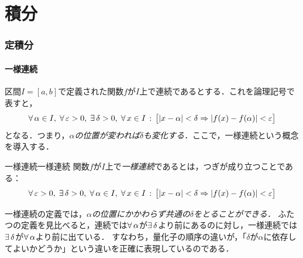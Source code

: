 \part{積分}

\begin{abstract}
この章では，定積分を厳密に定義するための準備として，まず一様連続の概念を導入し，有界閉区間上の連続関数が一様連続であることを示す．次に，区間の分割・上方和・下方和を定義し，細分によって上方和が減少し下方和が増加することを確認する．そのうえで，有界閉区間上の連続関数が積分可能であることを証明し，定積分の基本的な性質とリーマン和を導入する．最後に，$n$次元の有界閉区間に対する体積と分割を定義し，多次元の積分への足がかりとする．
\end{abstract}

\draftpart

\section{定積分}

\subsection{一様連続}

区間$I=[a,b]$で定義された関数$f$が$I$上で連続であるとする．これを論理記号で表すと，
\[
   \forall\, \alpha \in I ,\; \forall\, \varepsilon >0 ,\; \exists\, \delta >0 ,\; \forall\, x \in I \,:\, \bigl[ \lvert x-\alpha\rvert<\delta \mathrel{\Rightarrow} \lvert f(x)-f(\alpha)\rvert<\varepsilon \bigr]
\]
となる．つまり，\emph{$\alpha$の位置が変われば$\delta$も変化する．}ここで，一様連続という概念を導入する．

\begin{definition}{一様連続}{一様連続}
  関数$f$が$I$上で\emph{一様連続}であるとは，つぎが成り立つことである：
  \[
    \forall\, \varepsilon >0 ,\; \exists\, \delta >0 ,\; \forall\, \alpha \in I ,\; \forall\, x \in I \,:\, \bigl[ \lvert x-\alpha\rvert<\delta \mathrel{\Rightarrow} \lvert f(x)-f(\alpha)\rvert<\varepsilon \bigr]
  \]
\end{definition}

\begin{remark}[連続と一様連続の違い]
  一様連続の定義では，\emph{$\alpha$の位置にかかわらず共通の$\delta$をとることができる．}
  ふたつの定義を見比べると，連続では$\forall\, \alpha$が$\exists\, \delta$より前にあるのに対し，一様連続では$\exists\, \delta$が$\forall\, \alpha$より前に出ている．
  すなわち，量化子の順序の違いが，「$\delta$が$\alpha$に依存してよいかどうか」という違いを正確に表現しているのである．
\end{remark}

